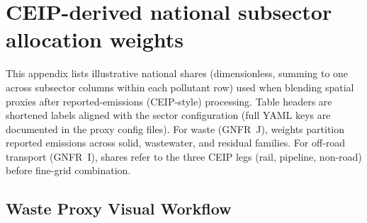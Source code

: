 
\chapter{CEIP-derived national subsector allocation weights}
\label{app:ceip-weights}

This appendix lists illustrative national shares (dimensionless, summing to one across
subsector columns within each pollutant row) used when blending spatial proxies after
reported-emissions (CEIP-style) processing. Table headers are shortened labels aligned
with the sector configuration (full YAML keys are documented in the proxy config files).
For waste (GNFR~J), weights partition reported emissions across solid, wastewater, and
residual families. For off-road transport (GNFR~I), shares refer to the three CEIP legs
(rail, pipeline, non-road) before fine-grid combination.

\section{Waste Proxy Visual Workflow}
\label{app:waste-proxy-workflow}

